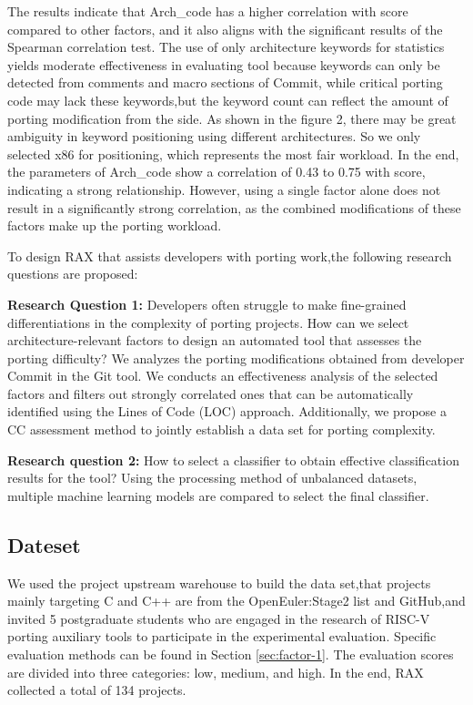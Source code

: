 \documentclass[sigconf,screen,review]{acmart}
\begin{document}
The results indicate that Arch\_code has a higher correlation with score compared to other factors, and it also aligns with the significant results of the Spearman correlation test.
The use of only architecture keywords for statistics yields moderate effectiveness in evaluating tool because keywords can only be detected from comments and macro sections of Commit, while critical porting code may lack these keywords,but the keyword count can reflect the amount of porting modification from the side.
As shown in the figure 2, there may be great ambiguity in keyword positioning using different architectures.
So we only selected x86 for positioning, which represents the most fair workload.
In the end, the parameters of Arch\_code show a correlation of 0.43 to 0.75 with score, indicating a strong relationship.
However, using a single factor alone does not result in a significantly strong correlation, as the combined modifications of these factors make up the porting workload.

To design RAX that assists developers with porting work,the following research questions are proposed:

\textbf{Research Question 1:} Developers often struggle to make fine-grained differentiations in the complexity of porting projects.
How can we select architecture-relevant factors to design an automated tool that assesses the porting difficulty?
We analyzes the porting modifications obtained from developer Commit in the Git tool.
We conducts an effectiveness analysis of the selected factors and filters out strongly correlated ones that can be automatically identified using the Lines of Code (LOC) approach.
Additionally, we propose a CC assessment method to jointly establish a data set for porting complexity.

\textbf{Research question 2:} How to select a classifier to obtain effective classification results for the tool?
Using the processing method of unbalanced datasets, multiple machine learning models are compared to select the final classifier.

\subsection{Dateset}
We used the project upstream warehouse to build the data set,that projects mainly targeting C and C++ are from the OpenEuler:Stage2 list and GitHub,and invited 5 postgraduate students who are engaged in the research of RISC-V porting auxiliary tools to participate in the experimental evaluation.
Specific evaluation methods can be found in Section \ref{sec:factor-1}.
The evaluation scores are divided into three categories: low, medium, and high.
In the end, RAX collected a total of 134 projects.
\end{document}
